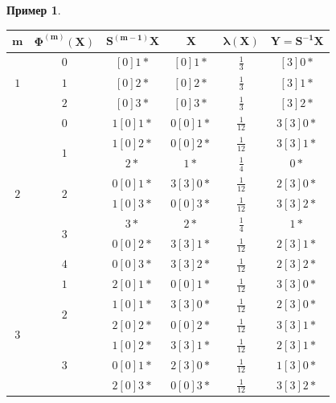 \documentclass[14pt, a4paper, russian]{report}
\newtheorem{example}{\indent Пример}
\begin{document}
\begin{example}
\begin{longtable}{|c|c|c|c|c|c|}
\hline
$\mathbf{m}$ & $\mathbf{\Phi^{(m)}(X)}$& $\mathbf{S^{(m-1)}X}$ & $\mathbf{X}$ & $\mathbf{\lambda(X)}$& $\mathbf{Y = S^{-1}X}$\\ \endhead
\hline
\multirow{3}{*}{$1$}  & $0$ &  $[0]1*$ & $[0]1*$ & $\frac{1}{3}$ & $[3]0*$ \\ \cline{2-6}
                    & $1$ &  $[0]2*$ & $[0]2*$ & $\frac{1}{3}$ & $[3]1*$ \\ \cline{2-6}
                    & $2$ &  $[0]3*$ & $[0]3*$ & $\frac{1}{3}$ & $[3]2*$ \\ \hline
\multirow{8}{*}{$2$}  & $0$ &  $1[0]1*$ & $0[0]1*$ & $\frac{1}{12}$ & $3[3]0*$ \\ \cline{2-6}
                    & \multirow{2}{*}{$1$}
                          &  $1[0]2*$ & $0[0]2*$ & $\frac{1}{12}$ & $3[3]1*$ \\ 
                    &     &  $2*$     & $1*$     & $\frac{1}{4}$  & $0*$     \\ \cline{2-6}
                    & \multirow{2}{*}{$2$}
                          &  $0[0]1*$ & $3[3]0*$ & $\frac{1}{12}$ & $2[3]0*$ \\
                    &     &  $1[0]3*$ & $0[0]3*$ & $\frac{1}{12}$ & $3[3]2*$ \\ \cline{2-6}
                    & \multirow{2}{*}{$3$}
                          &  $3*$     & $2*$     & $\frac{1}{4}$ & $1*$ \\
                    &     &  $0[0]2*$ & $3[3]1*$ & $\frac{1}{12}$ & $2[3]1*$ \\ \cline{2-6}
                    & $4$ &  $0[0]3*$ & $3[3]2*$ & $\frac{1}{12}$ & $2[3]2*$ \\ \hline
\multirow{10}{*}{$3$} & $1$ & $2[0]1*$ & $0[0]1*$ & $\frac{1}{12}$ & $3[3]0*$ \\ \cline{2-6}
                    & \multirow{2}{*}{$2$}
                          &  $1[0]1*$ & $3[3]0*$ & $\frac{1}{12}$ & $2[3]0*$ \\
                    &     &  $2[0]2*$ & $0[0]2*$ & $\frac{1}{12}$ & $3[3]1*$ \\ \cline{2-6}
                    & \multirow{4}{*}{$3$}
                          &  $1[0]2*$ & $3[3]1*$ & $\frac{1}{12}$ & $2[3]1*$ \\
                    &     &  $0[0]1*$ & $2[3]0*$ & $\frac{1}{12}$ & $1[3]0*$ \\
                    &     &  $2[0]3*$ & $0[0]3*$ & $\frac{1}{12}$ & $3[3]2*$ \\

\end{longtable}
\end{example}
\end{document}
